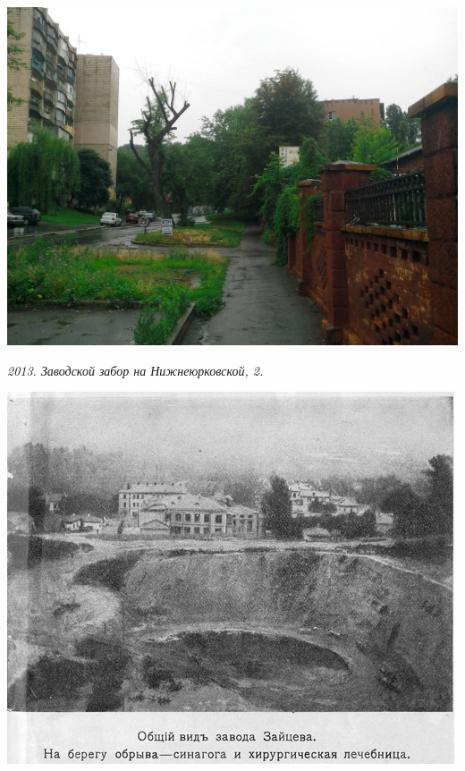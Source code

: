 \begin{center}
\includegraphics[width=0.98\linewidth]{pix/s-rihert-IMG_20130602_163103.jpg}

\textit{2013. Заводской забор на Нижнеюрковской, 2.}
\end{center} 

\newpage

\begin{center}
\includegraphics[width=\linewidth]{pix/zavod-zaiceva.png}
\end{center} 

